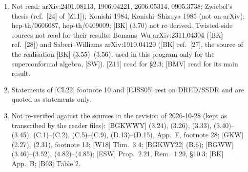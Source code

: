 \documentclass[11pt]{article}
\theoremstyle{definition}
\begin{document}
\begin{enumerate}
\item Not read: arXiv:2401.08113, 1906.04221, 2606.05314, 0905.3738; Zwiebel's thesis (ref.~[24] of [Z11]); Konishi 1984, Konishi--Shizuya 1985 (not on arXiv); hep-th/0606087, hep-th/0409009; [BK] (3.70) not re-derived. Twisted-side sources not read for their results: Bomans--Wu arXiv:2311.04304 ([BK] ref.~[28]) and Saberi--Williams arXiv:1910.04120 ([BK] ref.~[27], the source of the realisation [BK] (3.55)--(3.56); used in this program only for the superconformal algebra, [SW]). [Z11] read for \S2.3; [BMV] read for its main result.
\item Statements of [CL22] footnote 10 and [EJSS05] rest on DRED/SSDR and are quoted as statements only.
\item Not re-verified against the sources in the revision of 2026-10-28 (kept as transcribed by the reader files): [BGKWWY] (3.24), (3.26), (3.33), (3.40)--(3.45), (C.1)--(C.2), (C.5)--(C.9), (D.13)--(D.15), App.~E, footnote 28; [GKW] (2.27), (2.31), footnote 13; [W18] Thm.~3.4; [BGKWY22] (B.6); [BGWW] (3.46)--(3.52), (4.82)--(4.85); [ESW] Prop.~2.21, Rem.~1.29, \S10.3; [BK] App.~B; [B03] Table 2.
\end{enumerate}
\end{document}
